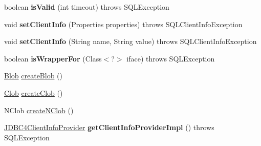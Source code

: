 \begin{DoxyCompactItemize}
\item 
\mbox{\label{classcom_1_1mysql_1_1jdbc_1_1_j_d_b_c4_replication_my_s_q_l_connection_a21b31b02b6a27b860b8ad4b34e3f2085}} 
boolean {\bfseries is\+Valid} (int timeout)  throws S\+Q\+L\+Exception 
\item 
\mbox{\label{classcom_1_1mysql_1_1jdbc_1_1_j_d_b_c4_replication_my_s_q_l_connection_a0d1eb50c3cd1662608a14e365a884705}} 
void {\bfseries set\+Client\+Info} (Properties properties)  throws S\+Q\+L\+Client\+Info\+Exception 
\item 
\mbox{\label{classcom_1_1mysql_1_1jdbc_1_1_j_d_b_c4_replication_my_s_q_l_connection_a80ceba0b9dd7933493cbff2d0e9683d2}} 
void {\bfseries set\+Client\+Info} (String name, String value)  throws S\+Q\+L\+Client\+Info\+Exception 
\item 
\mbox{\label{classcom_1_1mysql_1_1jdbc_1_1_j_d_b_c4_replication_my_s_q_l_connection_aca68814ac05ab5f56e67264cc4b0a7bd}} 
boolean {\bfseries is\+Wrapper\+For} (Class$<$?$>$ iface)  throws S\+Q\+L\+Exception 
\item 
\mbox{\hyperlink{classcom_1_1mysql_1_1jdbc_1_1_blob}{Blob}} \mbox{\hyperlink{classcom_1_1mysql_1_1jdbc_1_1_j_d_b_c4_replication_my_s_q_l_connection_a91bd6a4f8c35d68ebe6ecbde7f5632c6}{create\+Blob}} ()
\item 
\mbox{\hyperlink{classcom_1_1mysql_1_1jdbc_1_1_clob}{Clob}} \mbox{\hyperlink{classcom_1_1mysql_1_1jdbc_1_1_j_d_b_c4_replication_my_s_q_l_connection_a017c66f07b7c6170150400d4714e747a}{create\+Clob}} ()
\item 
N\+Clob \mbox{\hyperlink{classcom_1_1mysql_1_1jdbc_1_1_j_d_b_c4_replication_my_s_q_l_connection_ae41d8d69ab45f2c830674a653fa9bff2}{create\+N\+Clob}} ()
\item 
\mbox{\label{classcom_1_1mysql_1_1jdbc_1_1_j_d_b_c4_replication_my_s_q_l_connection_aacbd06e856556961fdb68b5c45afe9b8}} 
\mbox{\hyperlink{interfacecom_1_1mysql_1_1jdbc_1_1_j_d_b_c4_client_info_provider}{J\+D\+B\+C4\+Client\+Info\+Provider}} {\bfseries get\+Client\+Info\+Provider\+Impl} ()  throws S\+Q\+L\+Exception 
\end{DoxyCompactItemize}
